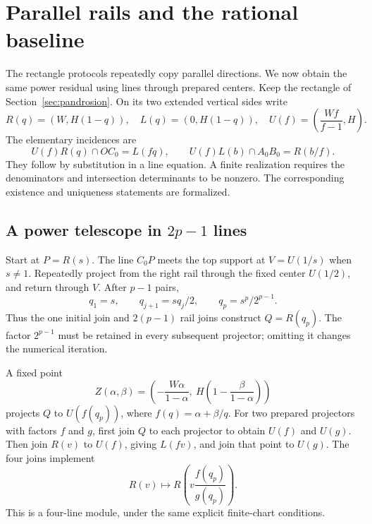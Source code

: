 \documentclass[11pt,a4paper]{article}
\theoremstyle{remark}\newtheorem{remark}[theorem]{Remark}
\begin{document}
\section{Parallel rails and the rational baseline}\label{sec:rails}
The rectangle protocols repeatedly copy parallel directions. We now obtain the same power residual using lines through prepared centers. Keep the rectangle of Section~\ref{sec:pandrosion}. On its two extended vertical sides write
\begin{equation}\label{eq:rails}
 R(q)=(W,H(1-q)),\quad L(q)=(0,H(1-q)),\quad
 U(f)=\left(\frac{Wf}{f-1},H\right).
\end{equation}
The elementary incidences are
\begin{equation}\label{eq:incidences}
 U(f)R(q)\cap OC_0=L(fq),\qquad U(f)L(b)\cap A_0B_0=R(b/f).
\end{equation}
They follow by substitution in a line equation. A finite realization requires the denominators and intersection determinants to be nonzero. The corresponding existence and uniqueness statements are formalized.

\subsection{A power telescope in \texorpdfstring{$2p-1$}{2p-1} lines}
Start at $P=R(s)$. The line $C_0P$ meets the top support at $V=U(1/s)$ when $s\ne1$. Repeatedly project from the right rail through the fixed center $U(1/2)$, and return through $V$. After $p-1$ pairs,
\begin{equation}\label{eq:telescope}
 q_1=s,\qquad q_{j+1}=sq_j/2,\qquad q_p=s^p/2^{p-1}.
\end{equation}
Thus the one initial join and $2(p-1)$ rail joins construct $Q=R(q_p)$. The factor $2^{p-1}$ must be retained in every subsequent projector; omitting it changes the numerical iteration.

A fixed point
\[
 Z(\alpha,\beta)=\left(-\frac{W\alpha}{1-\alpha},\ H\left(1-\frac{\beta}{1-\alpha}\right)\right)
\]
projects $Q$ to $U(f(q_p))$, where $f(q)=\alpha+\beta/q$. For two prepared projectors with factors $f$ and $g$, first join $Q$ to each projector to obtain $U(f)$ and $U(g)$. Then join $R(v)$ to $U(f)$, giving $L(fv)$, and join that point to $U(g)$. The four joins implement
\begin{equation}\label{eq:module}
 R(v)\longmapsto R\!\left(v\frac{f(q_p)}{g(q_p)}\right).
\end{equation}
This is a four-line module, under the same explicit finite-chart conditions.
\end{document}
